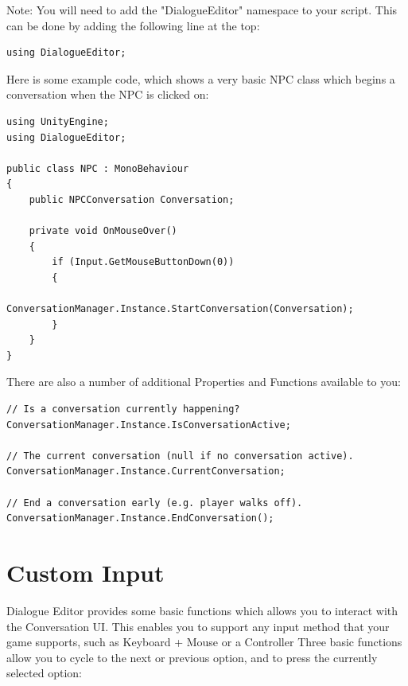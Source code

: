 \documentclass[a4paper,12pt]{article}
\begin{document}
Note: You will need to add the "DialogueEditor" namespace to your script. This can be done by adding the following line at the top:
\bigskip

\begin{lstlisting}
using DialogueEditor;
\end{lstlisting}
\bigskip

Here is some example code, which shows a very basic NPC class which begins a conversation when the NPC is clicked on:
\bigskip

\begin{lstlisting}
using UnityEngine;
using DialogueEditor;

public class NPC : MonoBehaviour
{
	public NPCConversation Conversation;

	private void OnMouseOver()
	{
		if (Input.GetMouseButtonDown(0))
		{
			ConversationManager.Instance.StartConversation(Conversation);
		}
	}
}
\end{lstlisting}
\bigskip


There are also a number of additional Properties and Functions available to you:
\bigskip

\begin{lstlisting}
// Is a conversation currently happening?
ConversationManager.Instance.IsConversationActive;

// The current conversation (null if no conversation active).
ConversationManager.Instance.CurrentConversation;

// End a conversation early (e.g. player walks off).
ConversationManager.Instance.EndConversation();
\end{lstlisting}


\newpage











\section{Custom Input}
\hypertarget{_custominput}{}
Dialogue Editor provides some basic functions which allows you to interact with the Conversation UI. This enables you to support any input method that your game supports, such as Keyboard + Mouse or a Controller
\newline
Three basic functions allow you to cycle to the next or previous option, and to press the currently selected option:
\bigskip
\end{document}
